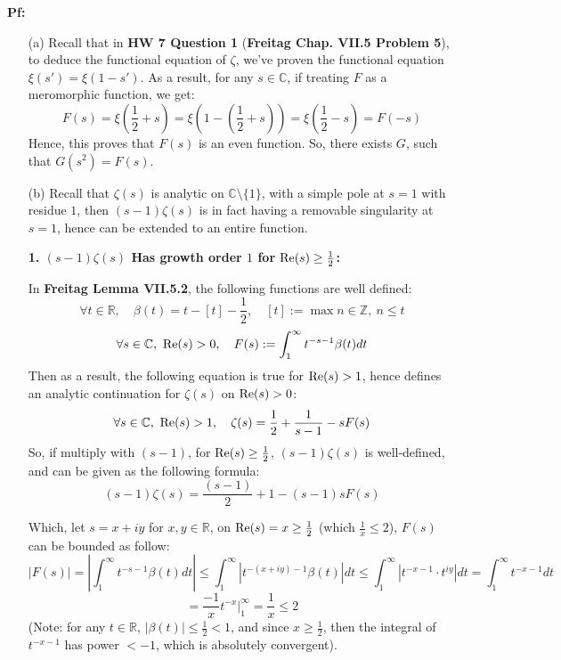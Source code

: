 \documentclass{article}
\begin{document}
\textbf{Pf:}
\begin{itemize}
    \item[(a)] Recall that in \textbf{HW 7 Question 1} (\textbf{Freitag Chap. VII.5 Problem 5}), to deduce the functional equation of $\zeta$, we've proven the functional equation $\xi(s')=\xi(1-s')$. As a result, for any $s\in\mathbb{C}$, if treating $F$ as a meromorphic function, we get:
    $$F(s)=\xi\left(\frac{1}{2}+s\right) = \xi\left(1-\left(\frac{1}{2}+s\right)\right) = \xi\left(\frac{1}{2}-s\right) = F(-s)$$
    Hence, this proves that $F(s)$ is an even function. So, there exists $G$, such that $G(s^2)=F(s)$.

    \hfil

    \item[(b)] Recall that $\zeta(s)$ is analytic on $\mathbb{C}\setminus\{1\}$, with a simple pole at $s=1$ with residue $1$, then $(s-1)\zeta(s)$ is in fact having a removable singularity at $s=1$, hence can be extended to an entire function.
    
    \hfil

    \textbf{1. $(s-1)\zeta(s)$ Has growth order $1$ for $\textmd{Re}(s)\geq \frac{1}{2}$:}

    In \textbf{Freitag Lemma VII.5.2}, the following functions are well defined:
    $$\forall t\in\mathbb{R},\quad \beta(t)=t-[t]-\frac{1}{2},\quad [t]:=\max{n\in\mathbb{Z},\ n\leq t}$$
    $$\forall s\in\mathbb{C},\ \textmd{Re}(s)>0,\quad F(s):=\int_{1}^{\infty}t^{-s-1}\beta(t)dt$$
    Then as a result, the following equation is true for $\textmd{Re}(s)>1$, hence defines an analytic continuation for $\zeta(s)$ on $\textmd{Re}(s)>0$:
    $$\forall s\in\mathbb{C},\ \textmd{Re}(s)>1,\quad \zeta(s)=\frac{1}{2}+\frac{1}{s-1}-sF(s)$$
    So, if multiply with $(s-1)$, for $\textmd{Re}(s)\geq \frac{1}{2}$, $(s-1)\zeta(s)$ is well-defined, and can be given as the following formula:
    $$(s-1)\zeta(s)=\frac{(s-1)}{2}+1-(s-1)sF(s)$$

    Which, let $s = x+iy$ for $x,y\in\mathbb{R}$, on $\textmd{Re}(s) = x \geq \frac{1}{2}$ (which $\frac{1}{x}\leq 2$), $F(s)$ can be bounded as follow:
    $$|F(s)| = \left|\int_{1}^{\infty}t^{-s-1}\beta(t)dt\right| \leq \int_{1}^{\infty}|t^{-(x+iy)-1}\beta(t)|dt \leq \int_{1}^{\infty}|t^{-x-1}\cdot t^{iy}|dt = \int_{1}^{\infty}t^{-x-1}dt$$
    $$ = \frac{-1}{x}t^{-x}\bigg|_{1}^{\infty} = \frac{1}{x}\leq 2$$
    (Note: for any $t\in\mathbb{R}$, $|\beta(t)|\leq \frac{1}{2}<1$, and since $x\geq \frac{1}{2}$, then the integral of $t^{-x-1}$ has power $<-1$, which is absolutely convergent).


\end{itemize}
\end{document}
